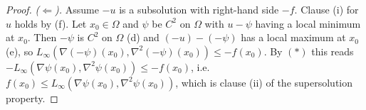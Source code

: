 \begin{proof}
\emph{($\Leftarrow$).} Assume $-u$ is a subsolution with right-hand side $-f$. Clause (i) for $u$ holds by (f). Let $x_0\in\Omega$ and $\psi$ be $C^2$ on $\Omega$ with $u-\psi$ having a local minimum at $x_0$. Then $-\psi$ is $C^2$ on $\Omega$ (d) and $(-u)-(-\psi)$ has a local maximum at $x_0$ (e), so $L_\infty(\nabla(-\psi)(x_0),\nabla^2(-\psi)(x_0))\le-f(x_0)$. By $(*)$ this reads $-L_\infty(\nabla\psi(x_0),\nabla^2\psi(x_0))\le-f(x_0)$, i.e.\ $f(x_0)\le L_\infty(\nabla\psi(x_0),\nabla^2\psi(x_0))$, which is clause (ii) of the supersolution property.
\end{proof}
